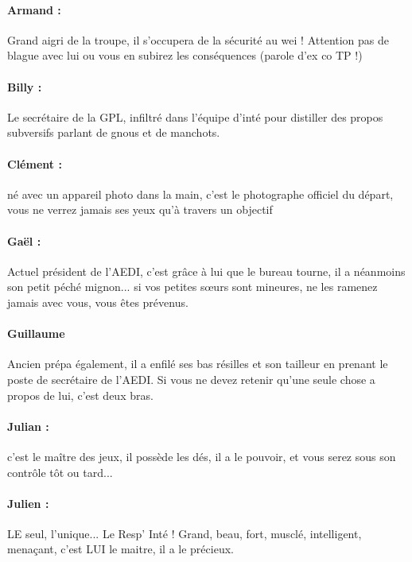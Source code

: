 \paragraph{Armand :} Grand aigri de la troupe, il s'occupera de la sécurité au wei ! Attention pas de blague avec lui ou vous en subirez les conséquences (parole d'ex co TP !)

\paragraph{Billy :} Le secrétaire de la GPL, infiltré dans l'équipe d'inté pour distiller des propos subversifs parlant de gnous et de manchots.

\paragraph{Clément :} né avec un appareil photo dans la main, c'est le photographe officiel du départ, vous ne verrez jamais ses yeux qu'à travers un objectif

\paragraph{Gaël :} Actuel président de l'AEDI, c'est grâce à lui que le bureau tourne, il a néanmoins son petit péché mignon... si vos petites sœurs sont mineures, ne les ramenez jamais avec vous, vous êtes prévenus.

\paragraph{Guillaume} Ancien prépa également, il a enfilé ses bas résilles et son tailleur en prenant le poste de secrétaire de l'AEDI. Si vous ne devez retenir qu'une seule chose a propos de lui, c'est deux bras.

\paragraph{Julian :} c'est le maître des jeux, il possède les dés, il a le pouvoir, et vous serez sous son contrôle tôt ou tard...
\clearpage
{}
\paragraph{Julien :}  LE seul, l'unique... Le Resp' Inté ! Grand, beau, fort, musclé, intelligent, menaçant, c'est LUI le maitre, il a le précieux.

